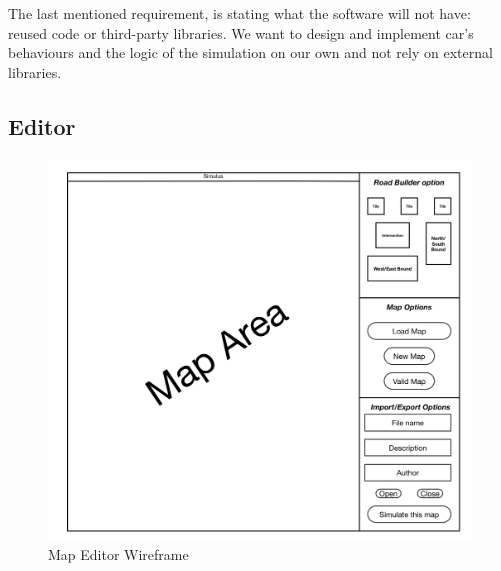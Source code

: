 The last mentioned requirement, is stating what the software will not have: reused code or third-party libraries. We want to design and implement car's behaviours and the logic of the simulation on our own and not rely on external libraries.

\subsection{Editor}\label{ss:req-editor}

\begin{figure}[h]
	\begin{center}
		\includegraphics[width=\textwidth]{img/Map_Editor_Wireframe.png}
		\caption{Map Editor Wireframe}
		\label{fig:editorwireframe}
	\end{center}
\end{figure}


